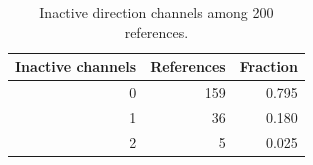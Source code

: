 \begin{table}[t]
\caption{Inactive direction channels among 200 references.}
\label{tab:inactive}
\centering
\begin{tabular}{rrr}
\toprule
Inactive channels & References & Fraction \\
\midrule
0 & 159 & 0.795 \\
1 & 36 & 0.180 \\
2 & 5 & 0.025 \\
\bottomrule
\end{tabular}
\end{table}
